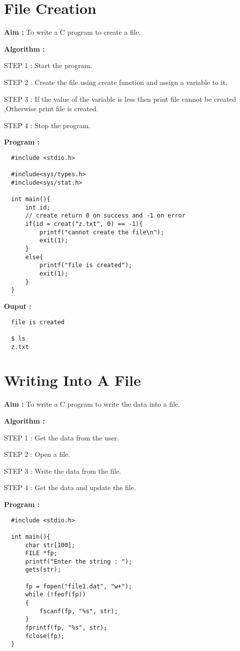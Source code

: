 \documentclass[journal,onecolumn]{IEEEtran}
\begin{document}
\section{File Creation}
\textbf{Aim : } To write a C program to create a file.

\textbf{Algorithm : }
\begin{list}{}{}
  \item STEP 1 : Start the program.
  \item STEP 2 : Create the file using create function and assign a variable to it.
  \item STEP 3 : If the value of the variable is less then print file cannot be created ,Otherwise print file is created.
  \item STEP 4 : Stop the program.
\end{list}

\textbf{Program : }
\begin{verbatim}
  #include <stdio.h>

  #include<sys/types.h>
  #include<sys/stat.h>
  
  int main(){
      int id;
      // create return 0 on success and -1 on error
      if(id = creat("z.txt", 0) == -1){
          printf("cannot create the file\n");
          exit(1);
      }
      else{
          printf("file is created");
          exit(1);
      }
  }
\end{verbatim}

\textbf{Ouput :}
\begin{verbatim}
  file is created

  $ ls 
  z.txt
\end{verbatim}



\section{Writing Into A File}
\textbf{Aim : } To write a C program to write the data into a file.

\textbf{Algorithm : }
\begin{list}{}{}
  \item STEP 1 : Get the data from the user. 
  \item STEP 2 : Open a file.
  \item STEP 3 : Write the data from the file. 
  \item STEP 4 : Get the data and update the file.
\end{list}

\textbf{Program : }
\begin{verbatim}
  #include <stdio.h>

  int main(){
      char str[100];
      FILE *fp;
      printf("Enter the string : ");
      gets(str);
      
      fp = fopen("file1.dat", "w+");
      while (!feof(fp))
      {
          fscanf(fp, "%s", str);
      }
      fprintf(fp, "%s", str);
      fclose(fp);
  }
\end{verbatim}
\end{document}
